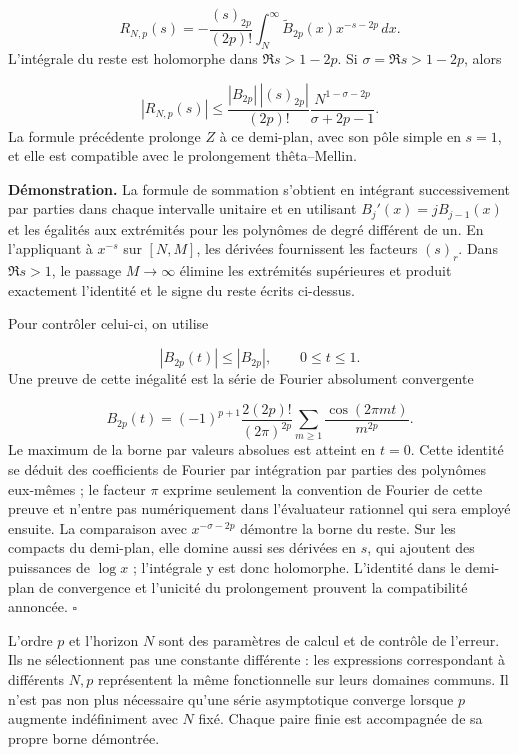 \[
R_{N,p}(s)=-\frac{(s)_{2p}}{(2p)!}
\int_N^\infty\widetilde B_{2p}(x)x^{-s-2p}\,dx.
\]
L'intégrale du reste est holomorphe dans \(\Re s>1-2p\). Si \(\sigma=\Re s>1-2p\), alors

\[
|R_{N,p}(s)|\leq
\frac{|B_{2p}|\,|(s)_{2p}|}{(2p)!}
\frac{N^{1-\sigma-2p}}{\sigma+2p-1}.
\]
La formule précédente prolonge \(Z\) à ce demi-plan, avec son pôle simple en \(s=1\), et elle est compatible avec le prolongement thêta–Mellin.

\textbf{Démonstration.} La formule de sommation s’obtient en intégrant successivement par parties dans chaque intervalle unitaire et en utilisant \(B_j'(x)=jB_{j-1}(x)\) et les égalités aux extrémités pour les polynômes de degré différent de un. En l’appliquant à \(x^{-s}\) sur \([N,M]\), les dérivées fournissent les facteurs \((s)_r\). Dans \(\Re s>1\), le passage \(M\to\infty\) élimine les extrémités supérieures et produit exactement l’identité et le signe du reste écrits ci-dessus.

Pour contrôler celui-ci, on utilise

\[
|B_{2p}(t)|\leq |B_{2p}|,\qquad 0\leq t\leq1.
\]
Une preuve de cette inégalité est la série de Fourier absolument convergente

\[
B_{2p}(t)=(-1)^{p+1}\frac{2(2p)!}{(2\pi)^{2p}}
\sum_{m\geq1}\frac{\cos(2\pi mt)}{m^{2p}}.
\]
Le maximum de la borne par valeurs absolues est atteint en \(t=0\). Cette identité se déduit des coefficients de Fourier par intégration par parties des polynômes eux-mêmes ; le facteur \(\pi\) exprime seulement la convention de Fourier de cette preuve et n’entre pas numériquement dans l’évaluateur rationnel qui sera employé ensuite. La comparaison avec \(x^{-\sigma-2p}\) démontre la borne du reste. Sur les compacts du demi-plan, elle domine aussi ses dérivées en \(s\), qui ajoutent des puissances de \(\log x\) ; l’intégrale y est donc holomorphe. L’identité dans le demi-plan de convergence et l’unicité du prolongement prouvent la compatibilité annoncée. \hfill\(\square\)

L'ordre \(p\) et l'horizon \(N\) sont des paramètres de calcul et de contrôle de l'erreur. Ils ne sélectionnent pas une constante différente : les expressions correspondant à différents \(N,p\) représentent la même fonctionnelle sur leurs domaines communs. Il n'est pas non plus nécessaire qu'une série asymptotique converge lorsque \(p\) augmente indéfiniment avec \(N\) fixé. Chaque paire finie est accompagnée de sa propre borne démontrée.


